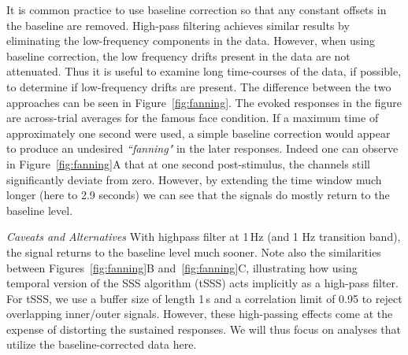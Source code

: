 It is common practice to use baseline correction so that any constant offsets in the baseline are removed. High-pass filtering achieves similar results by eliminating the low-frequency components in the data. However, when using baseline correction, the low frequency drifts present in the data are not attenuated. Thus it is useful to examine long time-courses of the data, if possible, to determine if low-frequency drifts are present. The difference between the two approaches can be seen in Figure~\ref{fig:fanning}. The evoked responses in the figure are across-trial averages for the famous face condition. If a maximum time of approximately one second were used, a simple baseline correction would appear to produce an undesired \textit{``fanning"} in the later responses. Indeed one can observe in Figure~\ref{fig:fanning}A that at one second post-stimulus, the channels still significantly deviate from zero. However, by extending the time window much longer (here to 2.9 seconds) we can see that the signals do mostly return to the baseline level.

\emph{Caveats and Alternatives} With highpass filter at 1\,Hz (and 1 Hz transition band), the signal returns to the baseline level much sooner. Note also the similarities between Figures~\ref{fig:fanning}B and~\ref{fig:fanning}C, illustrating how using temporal version of the SSS algorithm (tSSS) acts implicitly as a high-pass filter. For tSSS, we use a buffer size of length 1\,s and a correlation limit of 0.95 to reject overlapping inner/outer signals. However, these high-passing effects come at the expense of distorting the sustained responses. We will thus focus on analyses that utilize the baseline-corrected data here.
